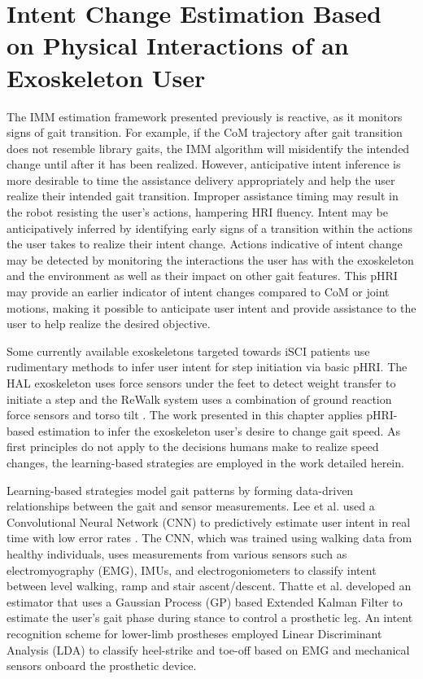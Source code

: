 \chapter{Intent Change Estimation Based on Physical Interactions of an	Exoskeleton User}\label{chapter:BKF}

The IMM estimation framework presented previously is reactive, as it monitors signs of gait transition. For example, if the CoM trajectory after gait transition does not resemble library gaits, the IMM algorithm will misidentify the intended change until after it has been realized. However, anticipative intent inference is more desirable to time the assistance delivery appropriately and help the user realize their intended gait transition. Improper assistance timing may result in the robot resisting the user's actions, hampering HRI fluency. Intent may be anticipatively inferred by identifying early signs of a transition within the actions the user takes to realize their intent change. Actions indicative of intent change may be detected by monitoring the interactions the user has with the exoskeleton and the environment as well as their impact on other gait features. This pHRI may provide an earlier indicator of intent changes compared to CoM or joint motions, making it possible to anticipate user intent and provide assistance to the user to help realize the desired objective. 

Some currently available exoskeletons targeted towards iSCI patients use rudimentary methods to infer user intent for step initiation via basic pHRI. The HAL exoskeleton uses force sensors under the feet to detect weight transfer to initiate a step \cite{suzuki2007intention} and the ReWalk system uses a combination of ground reaction force sensors and torso tilt \cite{goffer2012locomotion}. The work presented in this chapter applies pHRI-based estimation to infer the exoskeleton user's desire to change gait speed. As first principles do not apply to the decisions humans make to realize speed changes, the learning-based strategies are employed in the work detailed herein.

Learning-based strategies model gait patterns by forming data-driven relationships between the gait and sensor measurements. Lee et al. used a Convolutional Neural Network (CNN) to predictively estimate user intent in real time with low error rates \cite{lee2020image}. The CNN, which was trained using walking data from healthy individuals, uses measurements from various sensors such as electromyography (EMG), IMUs, and electrogoniometers to classify intent between level walking, ramp and stair ascent/descent. Thatte et al. developed an estimator that uses a Gaussian Process (GP) based Extended Kalman Filter \cite{thatte2019robust} to estimate the user's gait phase during stance to control a prosthetic leg. An intent recognition scheme for lower-limb prostheses \cite{young2013classifying} employed Linear Discriminant Analysis (LDA) to classify heel-strike and toe-off based on EMG and mechanical sensors onboard the prosthetic device. 

